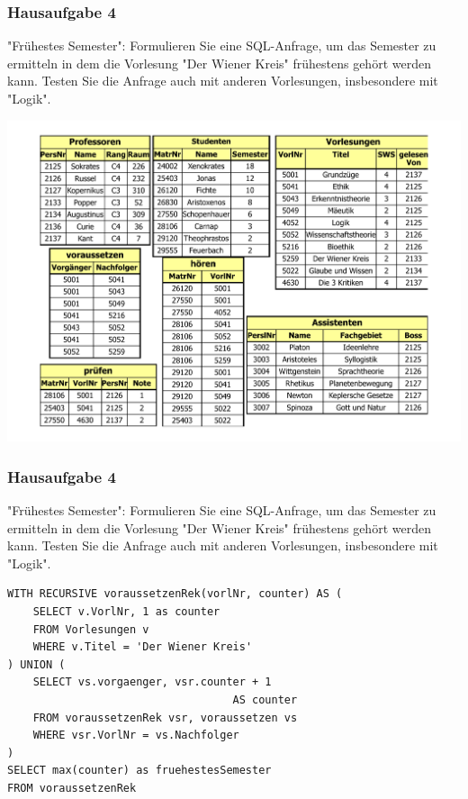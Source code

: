 \begin{frame}[fragile]
\frametitle{Hausaufgabe 4}
\vspace{0.5cm}

\begin{multicols}{2}
	"Frühestes Semester": Formulieren Sie eine SQL-Anfrage, 
	um das Semester zu ermitteln in dem die Vorlesung "Der Wiener Kreis" frühestens gehört 
	werden kann. Testen Sie die Anfrage auch mit anderen Vorlesungen, 
	insbesondere mit "Logik".
	\vfill\columnbreak
	
	\begin{center}
		\includegraphics[height=.6\paperheight]{../img/uni.pdf}
	\end{center}
\end{multicols}
\end{frame}

\begin{frame}[fragile]
\frametitle{Hausaufgabe 4}
\vspace{0.5cm}

\begin{multicols}{2}
	"Frühestes Semester": Formulieren Sie eine SQL-Anfrage, 
	um das Semester zu ermitteln in dem die Vorlesung "Der Wiener Kreis" frühestens gehört 
	werden kann. Testen Sie die Anfrage auch mit anderen Vorlesungen, 
	insbesondere mit "Logik".
	\vfill\columnbreak

	\begin{verbatim}
WITH RECURSIVE voraussetzenRek(vorlNr, counter) AS (
	SELECT v.VorlNr, 1 as counter
	FROM Vorlesungen v
	WHERE v.Titel = 'Der Wiener Kreis'
) UNION (
	SELECT vs.vorgaenger, vsr.counter + 1 
	                               AS counter
	FROM voraussetzenRek vsr, voraussetzen vs
	WHERE vsr.VorlNr = vs.Nachfolger
)
SELECT max(counter) as fruehestesSemester
FROM voraussetzenRek
	\end{verbatim}
\end{multicols}
\end{frame}
